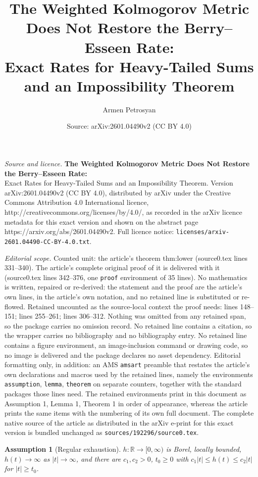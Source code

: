 \documentclass[10pt,a4paper]{amsart}
\title{\textbf{The Weighted Kolmogorov Metric Does Not Restore the Berry--Esseen Rate:} \\ \large Exact Rates for Heavy-Tailed Sums and an Impossibility Theorem}
\author{Armen Petrosyan}
\date{Source: arXiv:2601.04490v2 (CC BY 4.0)}
\newtheorem{assumption}{Assumption}
\newcommand{\R}{\mathbb{R}}
\newcommand{\h}{h}
\begin{document}
\maketitle

\noindent\emph{Source and licence.} \textbf{The Weighted Kolmogorov Metric Does Not Restore the Berry--Esseen Rate:} \\ \large Exact Rates for Heavy-Tailed Sums and an Impossibility Theorem. Version arXiv:2601.04490v2 (CC BY 4.0), distributed by arXiv under the Creative Commons Attribution 4.0 International licence, http://creativecommons.org/licenses/by/4.0/, as recorded in the arXiv licence metadata for this exact version and shown on the abstract page https://arxiv.org/abs/2601.04490v2. Full licence notice: \texttt{licenses/arxiv-2601.04490-CC-BY-4.0.txt}.\par\smallskip

\noindent\textit{Editorial scope.} Counted unit: the article's theorem thm:lower (source0.tex lines 331--340). The article's complete original proof of it is delivered with it (source0.tex lines 342--376, one \texttt{proof} environment of 35 lines). No mathematics is written, repaired or re-derived: the statement and the proof are the article's own lines, in the article's own notation, and no retained line is substituted or re-flowed.  Retained uncounted as the source-local context the proof needs: lines 148--151; lines 255--261; lines 306--312.  Nothing was omitted from any retained span, so the package carries no omission record.  No retained line contains a citation, so the wrapper carries no bibliography and no bibliography entry.  No retained line contains a figure environment, an image-inclusion command or drawing code, so no image is delivered and the package declares no asset dependency.  Editorial formatting only, in addition: an AMS \texttt{amsart} preamble that restates the article's own declarations and macros used by the retained lines, namely the environments \texttt{assumption}, \texttt{lemma}, \texttt{theorem} on separate counters, together with the standard packages those lines need.  The retained environments print in this document as Assumption 1, Lemma 1, Theorem 1 in order of appearance, whereas the article prints the same items with the numbering of its own full document.  The complete native source of the article as distributed in the arXiv e-print for this exact version is bundled unchanged as \texttt{sources/192296/source0.tex}.
\begin{assumption}[Regular exhaustion]\label{ass:h}
$\h:\R\to[0,\infty)$ is Borel, locally bounded, $\h(t)\to\infty$ as $|t|\to\infty$, and
there are $c_1,c_2>0$, $t_0\ge0$ with $c_1|t|\le \h(t)\le c_2|t|$ for $|t|\ge t_0$.
\end{assumption}
\end{document}
